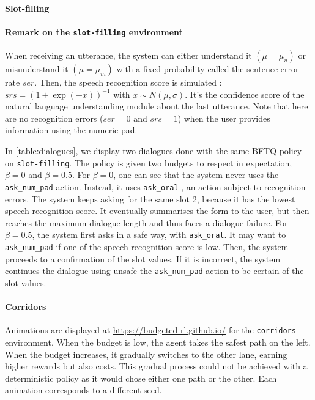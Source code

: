 \begin{subappendices}
\paragraph{Slot-filling}

\paragraph{Remark on the \texttt{slot-filling} environment} When receiving an utterance, the system can either understand it $(\mu=\mu_u)$ or misunderstand it $(\mu=\mu_m)$ with a fixed probability called the sentence error rate $ser$. Then, the speech recognition score is simulated \citep{Khouzaimi2015}: $srs = (1+\exp(-x))^{-1}$ with $x\sim N(\mu, \sigma)$. It's the confidence score of the natural language understanding module about the last utterance. Note that here are no recognition errors ($ser=0$ and $srs=1$) when the user provides information using the numeric pad.

In \autoref{table:dialogues}, we display two dialogues done with the same BFTQ policy on \texttt{slot-filling}. The policy is given two budgets to respect in expectation, $\beta=0$ and $\beta=0.5$. For $\beta=0$, one can see that the system never uses the \texttt{ask\_num\_pad} action. Instead, it uses \texttt{ask\_oral} , an action subject to recognition errors. The system keeps asking for the same slot 2, because it has the lowest speech recognition score. It eventually summarises the form to the user, but then reaches the maximum dialogue length and thus faces a dialogue failure. For $\beta=0.5$, the system first asks in a safe way, with \texttt{ask\_oral}. It may want to \texttt{ask\_num\_pad} if one of the speech recognition score is low. Then, the system proceeds to a confirmation of the slot values. If it is incorrect, the system continues the dialogue using unsafe the \texttt{ask\_num\_pad} action to be certain of the slot values.



\paragraph{Corridors}

Animations are displayed at  \href{https://budgeted-rl.github.io/\#optimal-budgeted-policies-learnt-with-a-risk-sensitive-exploration}{https://budgeted-rl.github.io/} for the \texttt{corridors} environment. When the budget is low, the agent takes the safest path on the left. When the budget increases, it gradually switches to the other lane, earning higher rewards but also costs. This gradual process could not be achieved with a deterministic policy as it would chose either one path or the other. Each animation corresponds to a different seed.


\end{subappendices}
